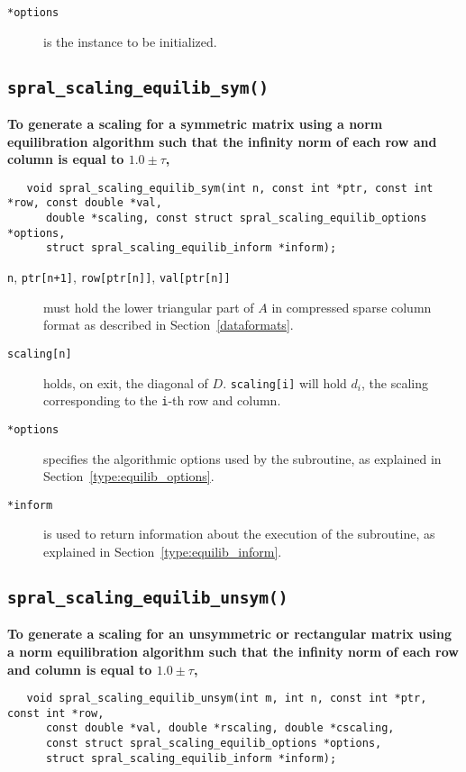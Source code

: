 \begin{description}
   \item[\texttt{*options}] is the instance to be initialized.
\end{description}

\subsection{\texttt{spral\_scaling\_equilib\_sym()}}

\textbf{\noindent
   To generate a scaling for a symmetric matrix using a norm equilibration algorithm such that the infinity norm of each row and column is equal to $1.0\pm\tau$,
}
\vspace*{-0.1cm}
\begin{verbatim}
   void spral_scaling_equilib_sym(int n, const int *ptr, const int *row, const double *val,
      double *scaling, const struct spral_scaling_equilib_options *options,
      struct spral_scaling_equilib_inform *inform);
\end{verbatim}

\begin{description}

\item[\texttt{n}, \texttt{ptr[n+1]}, \texttt{row[ptr[n]]}, \texttt{val[ptr[n]]}] must hold the lower triangular part of $A$ in compressed sparse column format as described in Section~\ref{dataformats}.

\item[\texttt{scaling[n]}] holds, on exit, the diagonal of $D$.
\texttt{scaling[i]} will hold $d_i$, the scaling corresponding to the
\texttt{i}-th row and column.

\item[\texttt{*options}] specifies the algorithmic options used by the subroutine, as explained in Section~\ref{type:equilib_options}.

\item[\texttt{*inform}] is used to return information about the execution of the subroutine, as explained in Section~\ref{type:equilib_inform}.


\end{description}


\subsection{\texttt{spral\_scaling\_equilib\_unsym()}}

\textbf{\noindent
   To generate a scaling for an unsymmetric or rectangular matrix using a norm equilibration algorithm such that the infinity norm of each row and column is equal to $1.0\pm\tau$,
}
\vspace*{-0.1cm}
\begin{verbatim}
   void spral_scaling_equilib_unsym(int m, int n, const int *ptr, const int *row,
      const double *val, double *rscaling, double *cscaling,
      const struct spral_scaling_equilib_options *options,
      struct spral_scaling_equilib_inform *inform);
\end{verbatim}

